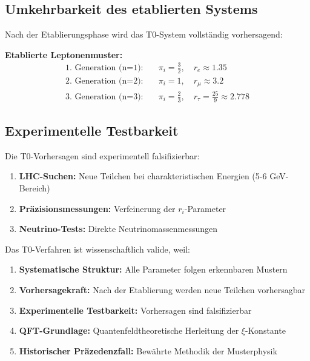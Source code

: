 \subsection{Umkehrbarkeit des etablierten Systems}
\label{subsec:reversibility}

Nach der Etablierungsphase wird das T0-System vollständig vorhersagend:

\textbf{Etablierte Leptonenmuster:}
\begin{align}
	\text{1. Generation (n=1):} \quad &\pi_i = \frac{3}{2}, \quad r_e \approx 1.35 \\
	\text{2. Generation (n=2):} \quad &\pi_i = 1, \quad r_\mu \approx 3.2 \\
	\text{3. Generation (n=3):} \quad &\pi_i = \frac{2}{3}, \quad r_\tau = \frac{25}{9} \approx 2.778
\end{align}

\subsection{Experimentelle Testbarkeit}
\label{subsec:experimental_testability}

Die T0-Vorhersagen sind experimentell falsifizierbar:

\begin{enumerate}
	\item \textbf{LHC-Suchen:} Neue Teilchen bei charakteristischen Energien (5-6 GeV-Bereich)
	\item \textbf{Präzisionsmessungen:} Verfeinerung der $r_i$-Parameter
	\item \textbf{Neutrino-Tests:} Direkte Neutrinomassenmessungen
\end{enumerate}

Das T0-Verfahren ist wissenschaftlich valide, weil:

\begin{enumerate}
	\item \textbf{Systematische Struktur:} Alle Parameter folgen erkennbaren Mustern
	\item \textbf{Vorhersagekraft:} Nach der Etablierung werden neue Teilchen vorhersagbar
	\item \textbf{Experimentelle Testbarkeit:} Vorhersagen sind falsifizierbar
	\item \textbf{QFT-Grundlage:} Quantenfeldtheoretische Herleitung der $\xi$-Konstante
	\item \textbf{Historischer Präzedenzfall:} Bewährte Methodik der Musterphysik
\end{enumerate}

